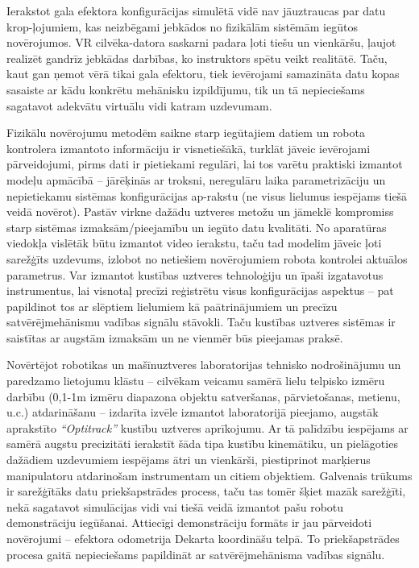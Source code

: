 \documentclass[12pt, a4paper]{article}
\numberwithin{equation}{section} %
\begin{document}
Ierakstot gala efektora konfigurācijas simulētā vidē nav jāuztraucas par datu krop-ļojumiem, kas neizbēgami jebkādos no fizikālām sistēmām iegūtos novērojumos. VR cilvēka-datora saskarni padara ļoti tiešu un vienkāršu, ļaujot realizēt gandrīz jebkādas darbības, ko instruktors spētu veikt realitātē. Taču, kaut gan ņemot vērā tikai gala efektoru, tiek ievērojami samazināta datu kopas sasaiste ar kādu konkrētu mehānisku izpildījumu, tik un tā nepieciešams sagatavot adekvātu virtuālu vidi katram uzdevumam.

Fizikālu novērojumu metodēm saikne starp iegūtajiem datiem un robota kontrolera izmantoto informāciju ir visnetiešākā, turklāt jāveic ievērojami pārveidojumi, pirms dati ir pietiekami regulāri, lai tos varētu praktiski izmantot modeļu apmācībā -- jārēķinās ar troksni, neregulāru laika parametrizāciju un nepietiekamu sistēmas konfigurācijas ap-rakstu (ne visus lielumus iespējams tiešā veidā novērot). Pastāv virkne dažādu uztveres metožu un jāmeklē kompromiss starp sistēmas izmaksām/pieejamību un iegūto datu kvalitāti. No aparatūras viedokļa vislētāk būtu izmantot video ierakstu, taču tad modelim jāveic ļoti sarežģīts uzdevums, izlobot no netiešiem novērojumiem robota kontrolei aktuālos parametrus. Var izmantot kustības uztveres tehnoloģiju un īpaši izgatavotus instrumentus, lai visnotaļ precīzi reģistrētu visus konfigurācijas aspektus -- pat papildinot tos ar slēptiem lielumiem kā paātrinājumiem un precīzu satvērējmehānismu vadības signālu stāvokli. Taču kustības uztveres sistēmas ir saistītas ar augstām izmaksām un ne vienmēr būs pieejamas praksē.

Novērtējot robotikas un mašīnuztveres laboratorijas tehnisko nodrošinājumu un paredzamo lietojumu klāstu -- cilvēkam veicamu samērā lielu telpisko izmēru darbību (0,1-1m izmēru diapazona objektu satveršanas, pārvietošanas, metienu, u.c.) atdarināšanu -- izdarīta izvēle izmantot laboratorijā pieejamo, augstāk aprakstīto \textit{``Optitrack''} kustību uztveres aprīkojumu. Ar tā palīdzību iespējams ar samērā augstu precizitāti ierakstīt šāda tipa kustību kinemātiku, un pielāgoties dažādiem uzdevumiem iespējams ātri un vienkārši, piestiprinot marķierus manipulatoru atdarinošam instrumentam un citiem objektiem. Galvenais trūkums ir sarežģītāks datu priekšapstrādes process, taču tas tomēr šķiet mazāk sarežģīti, nekā sagatavot simulācijas vidi vai tiešā veidā izmantot pašu robotu demonstrāciju iegūšanai. Attiecīgi demonstrāciju formāts ir jau pārveidoti novērojumi -- efektora odometrija Dekarta koordināšu telpā. To priekšapstrādes procesa gaitā nepieciešams papildināt ar satvērējmehānisma vadības signālu.
\end{document}

